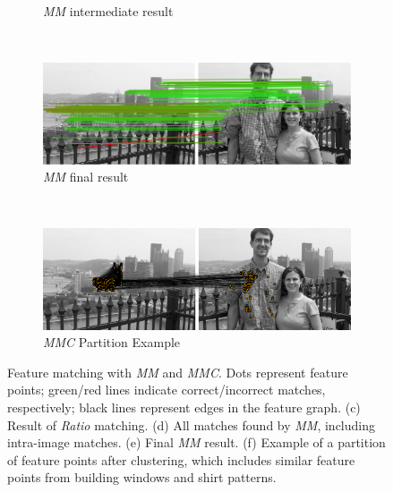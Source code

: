 \begin{figure}
\begin{subfigure}[t]{\columnwidth}
			\caption{\emph{MM} intermediate result}
			\label{fig:within}
		\end{subfigure}%
		\\ %
		\begin{subfigure}[t]{\columnwidth}
			\centering
			\includegraphics[width=0.85\columnwidth]{images/mirror_match}
			\caption{\emph{MM} final result}
			\label{fig:without}
		\end{subfigure}%
		\\ %
		\begin{subfigure}[t]{\columnwidth}
			\centering
			\includegraphics[width=0.85\columnwidth]{images/MMC_partition}
			\caption{\emph{MMC} Partition Example}
			\label{fig:pitts_partition}
		\end{subfigure}%
	\caption{Feature matching with \emph{MM} and \emph{MMC}. Dots represent feature points; green/red lines indicate correct/incorrect matches, respectively; black lines represent edges in the feature graph.  
	(c) Result of \emph{Ratio} matching. 
  (d) All matches found by \emph{MM}, including intra-image matches. 
	(e) Final \emph{MM} result. 
	(f) Example of a partition of feature points after clustering, which 
includes similar feature points from building windows and shirt patterns.}%
	\label{fig:comparemirror}%
\end{figure}%



